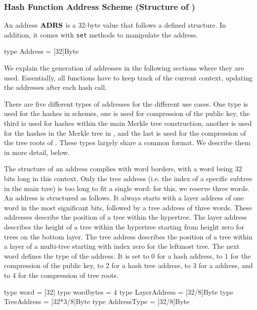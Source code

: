 \subsubsection{Hash Function Address Scheme (Structure of \adrs)}\label{prelim:addresses}

   An address $\textbf{ADRS}$ is a 32-byte value that follows a defined structure.
   In addition, it comes with \texttt{set} methods to manipulate the address.

\begin{code}
  type Address = [32]Byte
\end{code}

   We explain the generation of addresses in the following sections where they
   are used. Essentially, all functions have to keep track of the current
   context, updating the addresses after each hash call.

   There are five different types of addresses for the different use
   cases.  One type is used for the hashes in \wotsp schemes, one is used
   for compression of the \wotsp public key, the third is used for
   hashes within the main Merkle tree construction, another is used for
   the hashes in the Merkle tree in \fors, and the last is used for the
   compression of the tree roots of \fors. These types largely share a
   common format. We describe them in more detail, below.

   The structure of an address complies with word borders, with a word
   being 32 bits long in this context.  Only the tree address
   (i.e. the index of a specific subtree in the main tree) is too
   long to fit a single word: for this, we reserve three words. An address is
   structured as follows.  It always starts with a layer address of one
   word in the most significant bits, followed by a tree address of three
   words.  These addresses describe the position of a tree within the hypertree.
   The layer address describes the height of a tree within the
   hypertree starting from height zero for trees on the bottom layer.
   The tree address describes the position
   of a tree within a layer of a multi-tree starting with index zero for
   the leftmost tree.  The next word defines the type of the address.
   It is set to 0 for a \wotsp hash address, to 1 for the compression of the \wotsp public key,
   to 2 for a hash tree address, to 3 for a \fors address, and to 4 for the compression
   of \fors tree roots.

\begin{code}
  type word = [32]
  type wordbytes = 4
  type LayerAddress = [32/8]Byte
  type TreeAddress = [32*3/8]Byte
  type AddressType = [32/8]Byte
\end{code}

